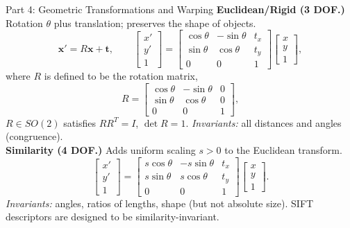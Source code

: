 \documentclass[letterpaper]{article}
\begin{document}
\begin{notes}{Part 4: Geometric Transformations and Warping}
\textbf{Euclidean/Rigid (3 DOF.)} Rotation $\theta$ plus translation; preserves the shape of objects.
$$\mathbf{x}' = R\mathbf{x}+\mathbf{t}, \qquad \begin{bmatrix}x'\\y'\\1\end{bmatrix} = \begin{bmatrix}\cos\theta&-\sin\theta&t_x\\\sin\theta&\cos\theta&t_y\\0&0&1\end{bmatrix}\begin{bmatrix}x\\y\\1\end{bmatrix},$$
where $R$ is defined to be the rotation matrix,
$$R=
\begin{bmatrix}
    \cos\theta&-\sin\theta& 0\\
    \sin\theta&\cos\theta& 0\\
    0&0&1
\end{bmatrix},
$$
$R\in SO(2)$ satisfies $RR^T=I$, $\det R=1$. \emph{Invariants:} all distances and angles (congruence).\\

\textbf{Similarity (4 DOF.)} Adds uniform scaling $s>0$ to the Euclidean transform.
$$\begin{bmatrix}x'\\y'\\1\end{bmatrix} = \begin{bmatrix}s\cos\theta&-s\sin\theta&t_x\\s\sin\theta&s\cos\theta&t_y\\0&0&1\end{bmatrix}\begin{bmatrix}x\\y\\1\end{bmatrix}.$$
\emph{Invariants:} angles, ratios of lengths, shape (but not absolute size). SIFT descriptors are designed to be similarity-invariant.\\


\end{notes}
\end{document}
